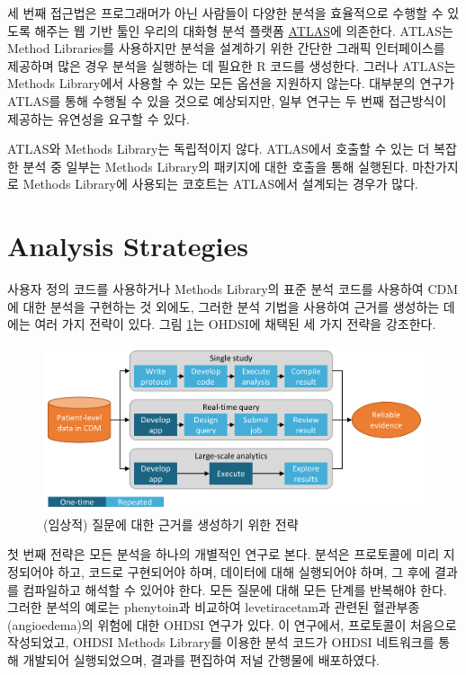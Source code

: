\documentclass[11pt]{book}
\theoremstyle{definition}
\theoremstyle{definition}
\theoremstyle{definition}
\theoremstyle{remark}
\begin{document}
세 번째 접근법은 프로그래머가 아닌 사람들이 다양한 분석을 효율적으로
수행할 수 있도록 해주는 웹 기반 툴인 우리의 대화형 분석 플랫폼
\href{https://github.com/OHDSI/Atlas/wiki}{ATLAS}에 의존한다. ATLAS는
Method Libraries를 사용하지만 분석을 설계하기 위한 간단한 그래픽
인터페이스를 제공하며 많은 경우 분석을 실행하는 데 필요한 R 코드를
생성한다. 그러나 ATLAS는 Methods Library에서 사용할 수 있는 모든 옵션을
지원하지 않는다. 대부분의 연구가 ATLAS를 통해 수행될 수 있을 것으로
예상되지만, 일부 연구는 두 번째 접근방식이 제공하는 유연성을 요구할 수
있다.

ATLAS와 Methods Library는 독립적이지 않다. ATLAS에서 호출할 수 있는 더
복잡한 분석 중 일부는 Methods Library의 패키지에 대한 호출을 통해
실행된다. 마찬가지로 Methods Library에 사용되는 코호트는 ATLAS에서
설계되는 경우가 많다.

\section{Analysis Strategies}\label{analysis-strategies}

사용자 정의 코드를 사용하거나 Methods Library의 표준 분석 코드를
사용하여 CDM에 대한 분석을 구현하는 것 외에도, 그러한 분석 기법을
사용하여 근거를 생성하는 데에는 여러 가지 전략이 있다. 그림
\ref{fig:strategies}는 OHDSI에 채택된 세 가지 전략을 강조한다.

\begin{figure}

{\centering \includegraphics[width=0.9\linewidth]{images/OhdsiAnalyticsTools/strategies} 

}

\caption{(임상적) 질문에 대한 근거를 생성하기 위한 전략}\label{fig:strategies}
\end{figure}

첫 번째 전략은 모든 분석을 하나의 개별적인 연구로 본다. 분석은
프로토콜에 미리 지정되어야 하고, 코드로 구현되어야 하며, 데이터에 대해
실행되어야 하며, 그 후에 결과를 컴파일하고 해석할 수 있어야 한다. 모든
질문에 대해 모든 단계를 반복해야 한다. 그러한 분석의 예로는 phenytoin과
비교하여 levetiracetam과 관련된 혈관부종(angioedema)의 위험에 대한 OHDSI
연구가 있다. \citep{duke_2017} 이 연구에서, 프로토콜이 처음으로
작성되었고, OHDSI Methods Library를 이용한 분석 코드가 OHDSI 네트워크를
통해 개발되어 실행되었으며, 결과를 편집하여 저널 간행물에 배포하였다.
\end{document}
